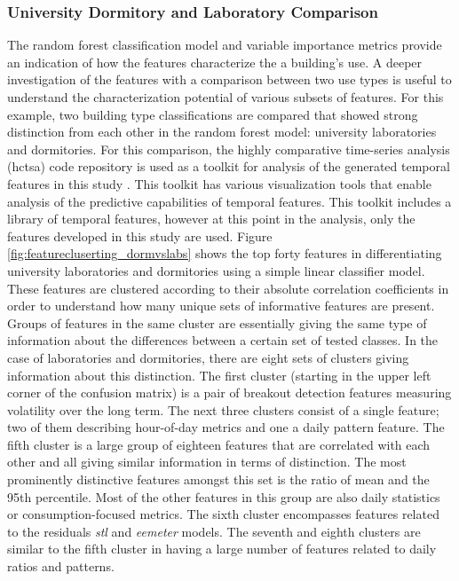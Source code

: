 \subsubsection{University Dormitory and Laboratory Comparison}
\label{sec:dormvslab}

The random forest classification model and variable importance metrics provide an indication of how the features characterize the a building's use. A deeper investigation of the features with a comparison between two use types is useful to understand the characterization potential of various subsets of features. For this example, two building type classifications are compared that showed strong distinction from each other in the random forest model: university laboratories and dormitories. For this comparison, the highly comparative time-series analysis (hctsa) code repository is used as a toolkit for analysis of the generated temporal features in this study \cite{Fulcher_2013}. This toolkit has various visualization tools that enable analysis of the predictive capabilities of temporal features. This toolkit includes a library of temporal features, however at this point in the analysis, only the features developed in this study are used. Figure \ref{fig:featurecluserting_dormvslabs} shows the top forty features in differentiating university laboratories and dormitories using a simple linear classifier model. These features are clustered according to their absolute correlation coefficients in order to understand how many unique sets of informative features are present. Groups of features in the same cluster are essentially giving the same type of information about the differences between a certain set of tested classes. In the case of laboratories and dormitories, there are eight sets of clusters giving information about this distinction. The first cluster (starting in the upper left corner of the confusion matrix) is a pair of breakout detection features measuring volatility over the long term. The next three clusters consist of a single feature; two of them describing hour-of-day metrics and one a daily pattern feature. The fifth cluster is a large group of eighteen features that are correlated with each other and all giving similar information in terms of distinction. The most prominently distinctive features amongst this set is the ratio of mean and the 95th percentile. Most of the other features in this group are also daily statistics or consumption-focused metrics. The sixth cluster encompasses features related to the residuals \emph{stl} and \emph{eemeter} models. The seventh and eighth clusters are similar to the fifth cluster in having a large number of features related to daily ratios and patterns. 